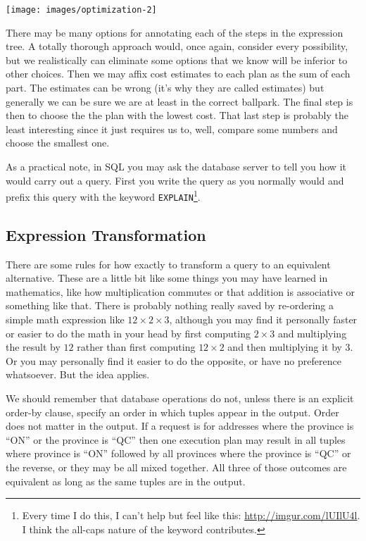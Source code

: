 \documentclass[a4paper]{report}
\begin{document}
\begin{center}
\texttt{[image: images/optimization-2]}
\end{center}

There may be many options for annotating each of the steps in the expression tree. A totally thorough approach would, once again, consider every possibility, but we realistically can eliminate some options that we know will be inferior to other choices. Then we may affix cost estimates to each plan as the sum of each part. The estimates can be wrong (it's why they are called estimates) but generally we can be sure we are at least in the correct ballpark. The final step is then to choose the the plan with the lowest cost. That last step is probably the least interesting since it just requires us to, well, compare some numbers and choose the smallest one.

As a practical note, in SQL you may ask the database server to tell you how it would carry out a query. First you write the query as you normally would and prefix this query with the keyword \texttt{EXPLAIN}\footnote{Every time I do this, I can't help but feel like this: \url{http://imgur.com/lUIlU4l}. I think the all-caps nature of the keyword contributes.}.

\subsection*{Expression Transformation}

There are some rules for how exactly to transform a query to an equivalent alternative. These are a little bit like some things you may have learned in mathematics, like how multiplication commutes or that addition is associative or something like that. There is probably nothing really saved by re-ordering a simple math expression like $12 \times 2 \times 3$, although you may find it personally faster or easier to do the math in your head by first computing $2 \times 3$ and multiplying the result by $12$ rather than first computing $12 \times 2$ and then multiplying it by $3$. Or you may personally find it easier to do the opposite, or have no preference whatsoever. But the idea applies.

We should remember that database operations do not, unless there is an explicit order-by clause, specify an order in which tuples appear in the output. Order does not matter in the output. If a request is for addresses where the province is ``ON'' or the province is ``QC'' then one execution plan may result in all tuples where province is ``ON'' followed by all provinces where the province is ``QC'' or the reverse, or they may be all mixed together. All three of those outcomes are equivalent as long as the same tuples are in the output.
\end{document}

